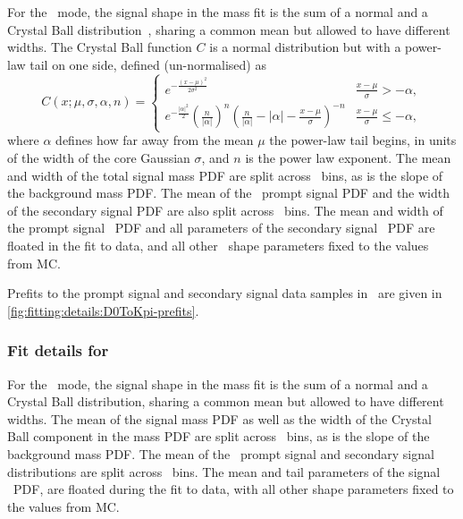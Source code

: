 For the \DzToKpi\ mode, the signal shape in the mass fit is the sum of a normal 
and a Crystal Ball distribution~\cite{Skwarnicki:1986xj}, sharing a common mean but allowed to have 
different widths.
The Crystal Ball function $C$ is a normal distribution but with a power-law 
tail on one side, defined (un-normalised) as
\begin{equation}
  C(x; \mu, \sigma, \alpha, n) = \begin{cases}
    e^{-\frac{{(x - \mu)}^{2}}{2\sigma^{2}}}                          & \frac{x - \mu}{\sigma} > -\alpha, \\
    e^{-\frac{|\alpha|^{2}}{2}}
      {(\frac{n}{|\alpha|})}^{n}
      {(\frac{n}{|\alpha|} - |\alpha| - \frac{x - \mu}{\sigma})}^{-n} & \frac{x - \mu}{\sigma} \leq -\alpha,
  \end{cases}
  \label{eqn:prod:fitting:crystal_ball}
\end{equation}
where $\alpha$ defines how far away from the mean $\mu$ the power-law tail 
begins, in units of the width of the core Gaussian $\sigma$, and $n$ is the 
power law exponent.
The mean and width of the total signal mass \ac{PDF} are split across \pTy\ 
bins, as is the slope of the background mass \ac{PDF}.
The mean of the \lnipchisq\ prompt signal \ac{PDF} and the width of the 
secondary signal \ac{PDF} are also split across \pTy\ bins.
The mean and width of the prompt signal \lnipchisq\ \ac{PDF} and all parameters 
of the secondary signal \lnipchisq\ \ac{PDF} are floated in the fit to data, 
and all other \lnipchisq\ shape parameters fixed to the values from \ac{MC}.

Prefits to the prompt signal and secondary signal data samples in \lnipchisq\ 
are given in \cref{fig:fitting:details:D0ToKpi-prefits}.

\subsubsection*{Fit details for \PDplus}
\label{chap:prod:fitting:details:D0ToKpi}

For the \DpToKpipi\ mode, the signal shape in the mass fit is the sum of a 
normal and a Crystal Ball distribution, sharing a common mean but allowed to 
have different widths.
The mean of the signal mass \ac{PDF} as well as the width of the Crystal Ball 
component in the mass \ac{PDF} are split across \pTy\ bins, as is the slope of 
the background mass \ac{PDF}.
The mean of the \lnipchisq\ prompt signal and secondary signal distributions 
are split across \pTy\ bins.
The mean and tail parameters of the signal \lnipchisq\ \ac{PDF}, are floated 
during the fit to data, with all other shape parameters fixed to the values 
from \ac{MC}.

